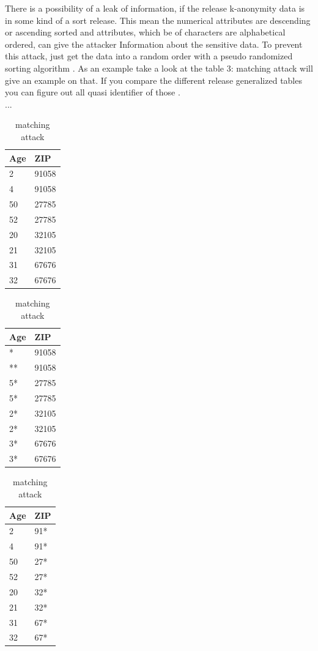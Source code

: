 \documentclass{llncs}
\begin{document}
There is a possibility of a leak of information, if the release k-anonymity data is in some kind of a sort release. This mean the numerical attributes are descending or ascending sorted and attributes, which be of characters are alphabetical ordered, can give the attacker Information about the sensitive data. To prevent this attack, just get the data into a random order with a pseudo randomized sorting algorithm \cite{sweeney2002k}. As an example take a look at the table 3: matching attack  will give an example on that. If you compare the different release generalized tables you can figure out all quasi identifier of those \cite{sweeney2002k}.
\\...
\begin{table}	
	\caption{matching attack}
	\centering
	\begin{tabular}[t]{|l|l|}		
	\hline
	Age & ZIP   \\ \hline
	2   & 91058 \\ 
	4   & 91058 \\ 
	50  & 27785 \\ 
	52  & 27785 \\ 
	20  & 32105 \\ 
	21  & 32105 \\ 
	31  & 67676 \\ 
	32  & 67676 \\ \hline
		\end{tabular}
	\hfill
	\begin{tabular}[t]{|l|l|}
	\hline
	Age & ZIP   \\ \hline
	*   & 91058 \\
	**   & 91058 \\
	5*  & 27785 \\
	5*  & 27785 \\
	2*  & 32105 \\
	2*  & 32105 \\
	3*  & 67676 \\
	3*  & 67676 \\ \hline  
	\end{tabular}
	\hfill
	\begin{tabular}[t]{|l|l|}
	\hline
	Age & ZIP   \\	\hline
	2   & 91*   \\
	4   & 91*   \\
	50  & 27*   \\
	52  & 27*   \\
	20  & 32*   \\
	21  & 32*   \\
	31  & 67*   \\
	32  & 67*   \\ \hline  
	\end{tabular}
\end{table}
\end{document}
